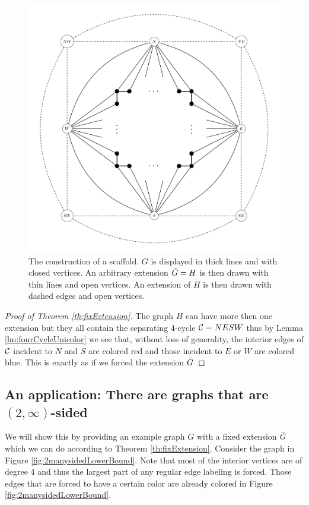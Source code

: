 \begin{figure}[h!]
\centering
\includegraphics[scale=0.5]{prelim/img/scafold}

\caption{The construction of a scaffold. $G$ is displayed in thick lines and with closed vertices. An arbitrary extension $\bar{G} =H$ is then drawn with thin lines and open vertices. An extension of $H$ is then drawn with dashed edges and open vertices.
    \label{fig:scafold}}
\end{figure}

\begin{proof}[Proof of Theorem \ref{th:fixExtension}]
  The graph $H$ can have more then one extension but they all contain the separating $4$-cycle $\mathcal{C}= NESW$ thus by Lemma \ref{lm:fourCycleUnicolor} we see that, without loss of generality, the interior edges of $\mathcal{C}$ incident to $N$ and $S$ are colored red and those incident to $E$ or $W$ are colored blue. This is exactly as if we forced the extension $\bar{G}$
  \end{proof}

\subsection{An application: There are graphs that are $(2, \infty)$-sided}

We will show this by providing an example graph $G$ with a fixed extension $\bar{G}$ which we can do according to Theorem \ref{th:fixExtension}. Consider the graph in Figure \ref{fig:2manysidedLowerBound}. Note that most of the interior vertices are of degree $4$ and thus the largest part of any regular edge labeling is forced. Those edges that are forced to have a certain color are already colored in Figure \ref{fig:2manysidedLowerBound}.


